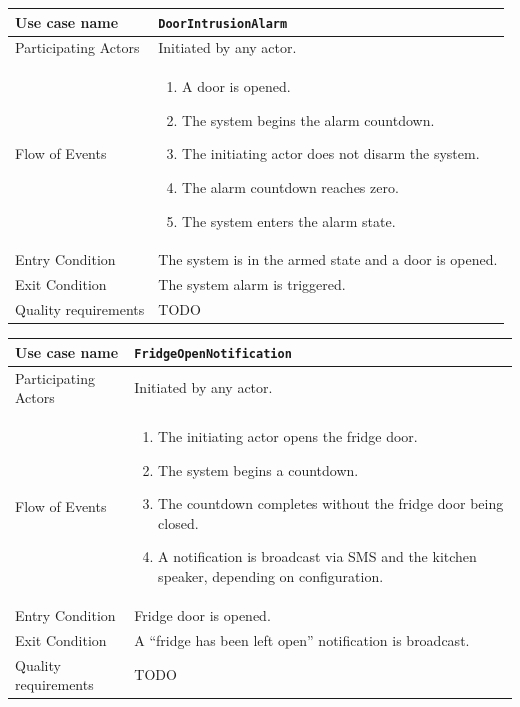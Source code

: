 \documentclass{report}
\begin{document}
\begin{tabular}{| l | p{7cm} |}
\hline
Use case name & \texttt{DoorIntrusionAlarm} \\ \hline
Participating Actors & Initiated by any actor. \\ \hline
Flow of Events & 

\begin{enumerate}
 \item A door is opened.
 \item The system begins the alarm countdown.
 \item The initiating actor does not disarm the system.
 \item The alarm countdown reaches zero.
 \item The system enters the alarm state.
\end{enumerate}

\\ \hline

Entry Condition & The system is in the armed state and a door is opened. \\ \hline
Exit Condition & The system alarm is triggered. \\ \hline
Quality requirements & TODO \\ \hline

\hline
\end{tabular}

\begin{tabular}{| l | p{7cm} |}
\hline
Use case name & \texttt{FridgeOpenNotification} \\ \hline
Participating Actors & Initiated by any actor. \\ \hline
Flow of Events & 

\begin{enumerate}
 \item The initiating actor opens the fridge door.
 \item The system begins a countdown.
 \item The countdown completes without the fridge door being closed.
 \item A notification is broadcast via SMS and the kitchen speaker, depending on configuration.
\end{enumerate}

\\ \hline

Entry Condition & Fridge door is opened. \\ \hline
Exit Condition & A ``fridge has been left open'' notification is broadcast. \\ \hline
Quality requirements & TODO \\ \hline

\hline
\end{tabular}
\end{document}
